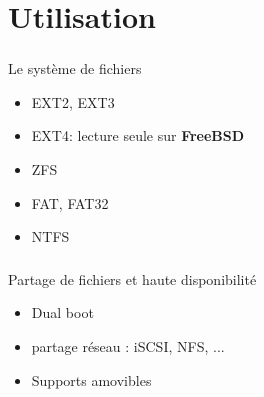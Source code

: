 \section{Utilisation}

\begin{frame}
	\frametitle{\insertsectionhead}
	\begin{block}{Le système de fichiers}
		\begin{itemize}
			\item EXT2, EXT3
			\item EXT4: lecture seule sur \textbf{FreeBSD}
			\item ZFS
			\item FAT, FAT32
			\item NTFS
		\end{itemize}
	\end{block}
\end{frame}

\begin{frame}
	\frametitle{\insertsectionhead}
	\begin{block}{Partage de fichiers et haute disponibilité}
		\begin{itemize}
			\item Dual boot
			\item partage réseau : iSCSI, NFS, ...
			\item Supports amovibles
		\end{itemize}
	\end{block}
\end{frame}

